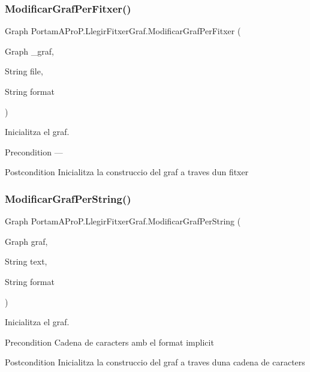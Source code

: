\subsubsection{\texorpdfstring{Modificar\+Graf\+Per\+Fitxer()}{ModificarGrafPerFitxer()}}
{\footnotesize\ttfamily Graph Portam\+A\+Pro\+P.\+Llegir\+Fitxer\+Graf.\+Modificar\+Graf\+Per\+Fitxer (\begin{DoxyParamCaption}\item[{Graph}]{\+\_\+graf,  }\item[{String}]{file,  }\item[{String}]{format }\end{DoxyParamCaption})}



Inicialitza el graf. 

\begin{DoxyPrecond}{Precondition}
--- 
\end{DoxyPrecond}
\begin{DoxyPostcond}{Postcondition}
Inicialitza la construccio del graf a traves d\textquotesingle{}un fitxer 
\end{DoxyPostcond}
\mbox{\label{class_portam_a_pro_p_1_1_llegir_fitxer_graf_a2c388c5057711db37543f939204134f2}} 
\subsubsection{\texorpdfstring{Modificar\+Graf\+Per\+String()}{ModificarGrafPerString()}}
{\footnotesize\ttfamily Graph Portam\+A\+Pro\+P.\+Llegir\+Fitxer\+Graf.\+Modificar\+Graf\+Per\+String (\begin{DoxyParamCaption}\item[{Graph}]{graf,  }\item[{String}]{text,  }\item[{String}]{format }\end{DoxyParamCaption})}



Inicialitza el graf. 

\begin{DoxyPrecond}{Precondition}
Cadena de caracters amb el format implicit 
\end{DoxyPrecond}
\begin{DoxyPostcond}{Postcondition}
Inicialitza la construccio del graf a traves d\textquotesingle{}una cadena de caracters 
\end{DoxyPostcond}
\mbox{\label{class_portam_a_pro_p_1_1_llegir_fitxer_graf_a9d28fa913057ede0ea78757f490e5a7d}} 
